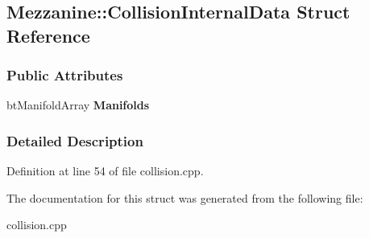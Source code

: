 \hypertarget{structMezzanine_1_1CollisionInternalData}{
\subsection{Mezzanine::CollisionInternalData Struct Reference}
\label{structMezzanine_1_1CollisionInternalData}
}
\subsubsection*{Public Attributes}
\begin{DoxyCompactItemize}
\item 
\hypertarget{structMezzanine_1_1CollisionInternalData_a9f62c525b0438ef18a6475d78474c340}{
btManifoldArray {\bfseries Manifolds}}
\label{structMezzanine_1_1CollisionInternalData_a9f62c525b0438ef18a6475d78474c340}

\end{DoxyCompactItemize}


\subsubsection{Detailed Description}


Definition at line 54 of file collision.cpp.



The documentation for this struct was generated from the following file:\begin{DoxyCompactItemize}
\item 
collision.cpp\end{DoxyCompactItemize}
